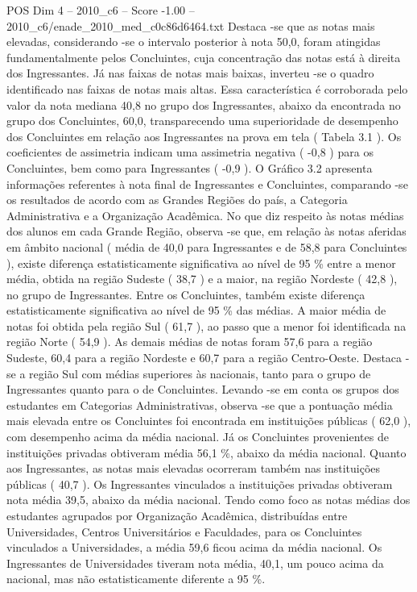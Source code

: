 \begin{textsample}{POS Dim 4 – 2010\_c6 – Score -1.00 – 2010\_c6/enade\_2010\_med\_c0c86d6464.txt}
Destaca -se que as notas mais elevadas, considerando -se o intervalo posterior à nota 50,0, foram atingidas fundamentalmente pelos Concluintes, cuja concentração das notas está à direita dos Ingressantes.
Já nas faixas de notas mais baixas, inverteu -se o quadro identificado nas faixas de notas mais altas.
Essa característica é corroborada pelo valor da nota mediana 40,8 no grupo dos Ingressantes, abaixo da encontrada no grupo dos Concluintes, 60,0, transparecendo uma superioridade de desempenho dos Concluintes em relação aos Ingressantes na prova em tela ( Tabela 3.1 ).
Os coeficientes de assimetria indicam uma assimetria negativa ( -0,8 ) para os Concluintes, bem como para Ingressantes ( -0,9 ).
O Gráfico 3.2 apresenta informações referentes à nota final de Ingressantes e Concluintes, comparando -se os resultados de acordo com as Grandes Regiões do país, a Categoria Administrativa e a Organização Acadêmica.
No que diz respeito às notas médias dos alunos em cada Grande Região, observa -se que, em relação às notas aferidas em âmbito nacional ( média de 40,0 para Ingressantes e de 58,8 para Concluintes ), existe diferença estatisticamente significativa ao nível de 95 \% entre a menor média, obtida na região Sudeste ( 38,7 ) e a maior, na região Nordeste ( 42,8 ), no grupo de Ingressantes.
Entre os Concluintes, também existe diferença estatisticamente significativa ao nível de 95 \% das médias.
A maior média de notas foi obtida pela região Sul ( 61,7 ), ao passo que a menor foi identificada na região Norte ( 54,9 ).
As demais médias de notas foram 57,6 para a região Sudeste, 60,4 para a região Nordeste e 60,7 para a região Centro-Oeste.
Destaca -se a região Sul com médias superiores às nacionais, tanto para o grupo de Ingressantes quanto para o de Concluintes.
Levando -se em conta os grupos dos estudantes em Categorias Administrativas, observa -se que a pontuação média mais elevada entre os Concluintes foi encontrada em instituições públicas ( 62,0 ), com desempenho acima da média nacional.
Já os Concluintes provenientes de instituições privadas obtiveram média 56,1 \%, abaixo da média nacional.
Quanto aos Ingressantes, as notas mais elevadas ocorreram também nas instituições públicas ( 40,7 ).
Os Ingressantes vinculados a instituições privadas obtiveram nota média 39,5, abaixo da média nacional.
Tendo como foco as notas médias dos estudantes agrupados por Organização Acadêmica, distribuídas entre Universidades, Centros Universitários e Faculdades, para os Concluintes vinculados a Universidades, a média 59,6 ficou acima da média nacional.
Os Ingressantes de Universidades tiveram nota média, 40,1, um pouco acima da nacional, mas não estatisticamente diferente a 95 \%.

\end{textsample}
